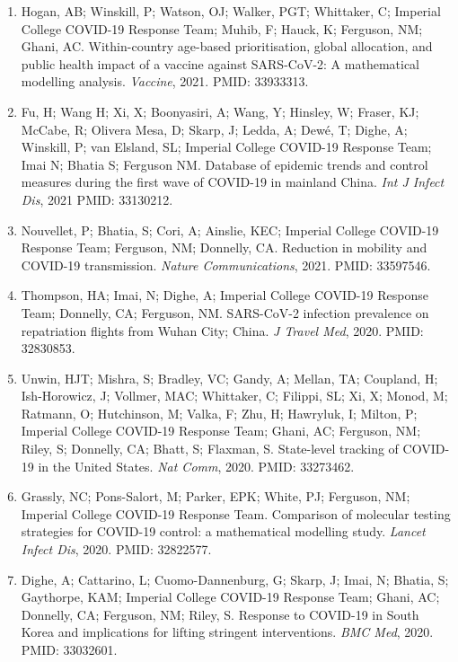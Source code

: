 \documentclass[11pt,letterpaper]{article}
\begin{document}
\begin{enumerate}[leftmargin=*, itemsep=4pt, parsep=0pt]

\item Hogan, AB; Winskill, P; Watson, OJ; Walker, PGT; Whittaker, C; Imperial College COVID-19 Response Team; Muhib, F; Hauck, K; Ferguson, NM; Ghani, AC. Within-country age-based prioritisation, global allocation, and public health impact of a vaccine against SARS-CoV-2: A mathematical modelling analysis. \textit{Vaccine}, 2021. PMID: 33933313.

\item Fu, H; Wang H; Xi, X; Boonyasiri, A; Wang, Y; Hinsley, W; Fraser, KJ; McCabe, R; Olivera Mesa, D; Skarp, J; Ledda, A; Dewé, T; Dighe, A; Winskill, P; van Elsland, SL; Imperial College COVID-19 Response Team; Imai N; Bhatia S; Ferguson NM. Database of epidemic trends and control measures during the first wave of COVID-19 in mainland China. \textit{Int J Infect Dis}, 2021 PMID: 33130212.

\item Nouvellet, P; Bhatia, S; Cori, A; Ainslie, KEC; Imperial College COVID-19 Response Team; Ferguson, NM; Donnelly, CA. Reduction in mobility and COVID-19 transmission. \textit{Nature Communications}, 2021. PMID: 33597546.

\item Thompson, HA; Imai, N; Dighe, A; Imperial College COVID-19 Response Team; Donnelly, CA; Ferguson, NM. SARS-CoV-2 infection prevalence on repatriation flights from Wuhan City; China. \textit{J Travel Med}, 2020. PMID: 32830853.

\item Unwin, HJT; Mishra, S; Bradley, VC; Gandy, A; Mellan, TA; Coupland, H; Ish-Horowicz, J; Vollmer, MAC; Whittaker, C; Filippi, SL; Xi, X; Monod, M; Ratmann, O; Hutchinson, M; Valka, F; Zhu, H; Hawryluk, I; Milton, P; Imperial College COVID-19 Response Team; Ghani, AC; Ferguson, NM; Riley, S; Donnelly, CA; Bhatt, S; Flaxman, S. State-level tracking of COVID-19 in the United States. \textit{Nat Comm}, 2020. PMID: 33273462.

\item Grassly, NC; Pons-Salort, M; Parker, EPK; White, PJ; Ferguson, NM; Imperial College COVID-19 Response Team. Comparison of molecular testing strategies for COVID-19 control: a mathematical modelling study. \textit{Lancet Infect Dis}, 2020. PMID: 32822577.

\item Dighe, A; Cattarino, L; Cuomo-Dannenburg, G; Skarp, J; Imai, N; Bhatia, S; Gaythorpe, KAM; Imperial College COVID-19 Response Team; Ghani, AC; Donnelly, CA; Ferguson, NM; Riley, S. Response to COVID-19 in South Korea and implications for lifting stringent interventions. \textit{BMC Med}, 2020. PMID: 33032601.


\end{enumerate}
\end{document}
